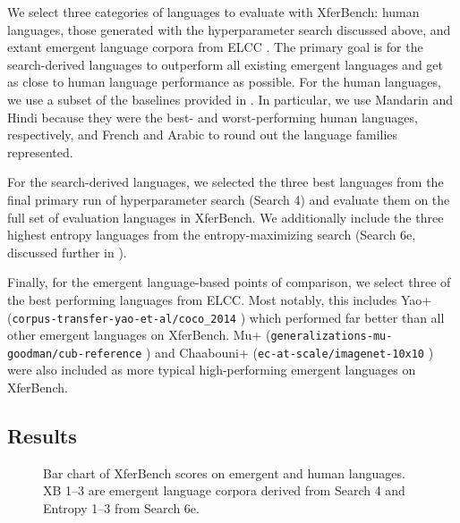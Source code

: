 We select three categories of languages to evaluate with XferBench:
  human languages, those generated with the hyperparameter search discussed above, and extant emergent language corpora from ELCC \citep[\smallish\url{https://huggingface.co/datasets/bboldt/elcc}, CC BY 4.0]{elcc}.
The primary goal is for the search-derived languages to outperform all existing emergent languages and get as close to human language performance as possible.
For the human languages, we use a subset of the baselines provided in \citet{boldt-mortensen-2024-xferbench}.
In particular, we use Mandarin and Hindi because they were the best- and worst-performing human languages, respectively, and French and Arabic to round out the language families represented.

For the search-derived languages, we selected the three best languages from the final primary run of hyperparameter search (Search 4) and evaluate them on the full set of evaluation languages in XferBench.
We additionally include the three highest entropy languages from the entropy-maximizing search (Search 6e, discussed further in ).

Finally, for the emergent language-based points of comparison, we select three of the best performing languages from ELCC\@.
Most notably, this includes Yao+ (\texttt{\smallish corpus-transfer-\allowbreak yao-et-al/\mbox{coco\_2014}} \citep{yao2022linking}) which performed far better than all other emergent languages on XferBench.
Mu+ (\texttt{\smallish generalizations-\allowbreak mu-goodman/\allowbreak cub-reference} \citep{mu2021emergent}) and Chaabouni+ (\texttt{\smallish ec-at-scale/imagenet-10x10} \citep{chaabouni2022emergent}) were also included as more typical high-performing emergent languages on XferBench.


\subsection{Results}
\begin{figure}
  \centering
  \caption{Bar chart of XferBench scores on emergent and human languages.  XB 1--3 are emergent language corpora derived from Search 4 and Entropy 1--3 from Search 6e.}
  \unskip\label{hpo:fig:bar}
\end{figure}


